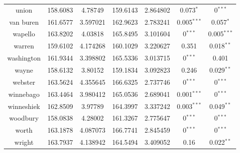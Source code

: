 \begin{table}[]
\begin{tabular}{|c|cc|cc|cc|}
union         & 158.6083  & 4.78749           & 159.6143  & 2.864802          & 0.073$^{*}$   & 0$^{***}$     \\
van buren     & 161.6577  & 3.597021          & 162.9623  & 2.783241          & 0.005$^{***}$ & 0.057$^{*}$   \\
wapello       & 163.8202  & 4.03818           & 165.8495  & 3.101604          & 0$^{***}$     & 0.005$^{***}$ \\
warren        & 159.6102  & 4.174268          & 160.1029  & 3.220627          & 0.351                         & 0.018$^{**}$  \\
washington    & 161.9344  & 3.398802          & 165.5336  & 3.013715          & 0$^{***}$     & 0.401                         \\
wayne         & 158.6132  & 3.80152           & 159.1834  & 3.092823          & 0.246                         & 0.029$^{**}$  \\
webster       & 163.5624  & 4.355645          & 166.6325  & 2.737746          & 0$^{***}$     & 0$^{***}$     \\
winnebago     & 163.4464  & 3.980412          & 165.0536  & 2.689041          & 0.001$^{***}$ & 0$^{***}$     \\
winneshiek    & 162.8509  & 3.97789           & 164.3997  & 3.337242          & 0.003$^{***}$ & 0.049$^{**}$  \\
woodbury      & 158.0838  & 4.28002           & 161.3267  & 2.775647          & 0$^{***}$     & 0$^{***}$     \\
worth         & 163.1878  & 4.087073          & 166.7741  & 2.845459          & 0$^{***}$     & 0$^{***}$     \\
wright        & 163.7937  & 4.138942          & 164.5494  & 3.409052          & 0.16                          & 0.022$^{**}$ 
\\
\hline
\end{tabular}
\end{table}

